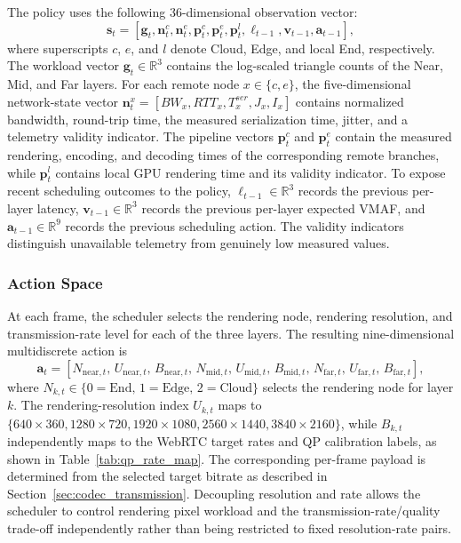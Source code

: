 \documentclass[acmsmall]{acmart}
\begin{document}
	The policy uses the following 36-dimensional observation vector:
	\begin{equation}
		\mathbf{s}_t = [\mathbf{g}_t,\mathbf{n}^{c}_t,\mathbf{n}^{e}_t,
		\mathbf{p}^{c}_t,\mathbf{p}^{e}_t,\mathbf{p}^{l}_t,
		\boldsymbol{\ell}_{t-1},\mathbf{v}_{t-1},\mathbf{a}_{t-1}],
	\end{equation}
	where superscripts $c$, $e$, and $l$ denote Cloud, Edge, and local End, respectively.
	The workload vector $\mathbf{g}_t\in\mathbb{R}^{3}$ contains the log-scaled triangle counts of the Near,
	Mid, and Far layers. For each remote node $x\in\{c,e\}$, the five-dimensional network-state vector
	$\mathbf{n}^{x}_t=[BW_x,RTT_x,T^{ser}_x,J_x,I_x]$ contains normalized bandwidth, round-trip
	time, the measured serialization time, jitter, and a telemetry validity indicator. The pipeline vectors
	$\mathbf{p}^{c}_t$ and $\mathbf{p}^{e}_t$ contain the measured rendering, encoding, and decoding
	times of the corresponding remote branches, while $\mathbf{p}^{l}_t$ contains local GPU rendering time and its validity indicator.
	To expose recent scheduling outcomes to the policy, $\boldsymbol{\ell}_{t-1}\in\mathbb{R}^{3}$ records the previous per-layer latency, $\mathbf{v}_{t-1}\in\mathbb{R}^{3}$ records the previous per-layer expected VMAF, and $\mathbf{a}_{t-1}\in\mathbb{R}^{9}$ records the previous scheduling action. The validity indicators distinguish unavailable telemetry from genuinely low measured values.
	
	\subsubsection{Action Space}
	\label{sec:action_space}

	At each frame, the scheduler selects the rendering node, rendering resolution, and transmission-rate level for each of the three layers. The resulting nine-dimensional multidiscrete action is
	\begin{equation}
		\mathbf{a}_t = [N_{\mathrm{near},t},\, U_{\mathrm{near},t},\, B_{\mathrm{near},t},\,
		N_{\mathrm{mid},t},\, U_{\mathrm{mid},t},\, B_{\mathrm{mid},t},\,
		N_{\mathrm{far},t},\, U_{\mathrm{far},t},\, B_{\mathrm{far},t}],
	\end{equation}
	where $N_{k,t} \in \{0\!=\!\text{End},\, 1\!=\!\text{Edge},\, 2\!=\!\text{Cloud}\}$ selects the
	rendering node for layer $k$. The rendering-resolution index $U_{k,t}$ maps to
	$\{640\!\times\!360,1280\!\times\!720,1920\!\times\!1080,2560\!\times\!1440,
	3840\!\times\!2160\}$, while $B_{k,t}$ independently maps to the WebRTC target rates and QP
	calibration labels, as shown in Table~\ref{tab:qp_rate_map}. The corresponding per-frame payload is determined from the selected target bitrate as described in Section~\ref{sec:codec_transmission}. Decoupling resolution and rate allows the scheduler to control rendering pixel workload and the transmission-rate/quality trade-off independently rather than being restricted to fixed resolution-rate pairs.
\end{document}

